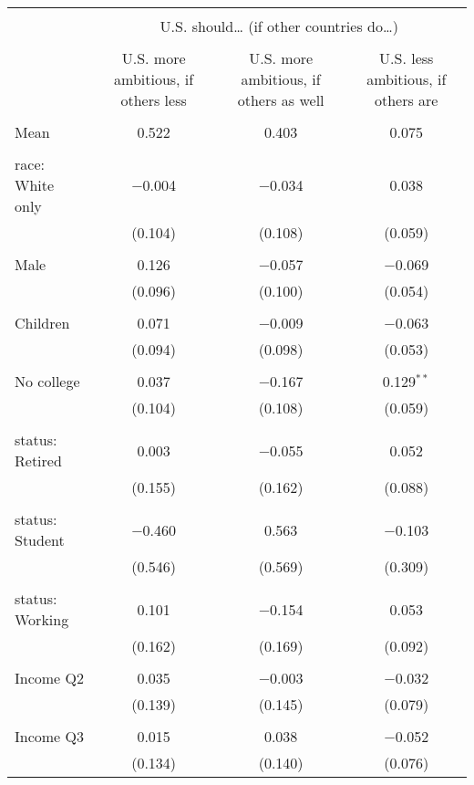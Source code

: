 
\begin{tabular}{@{\extracolsep{5pt}}lccc} 
\\[-1.8ex]\hline 
\hline \\[-1.8ex] 
 & \multicolumn{3}{c}{U.S. should… (if other countries do…)} \\ 
\cline{2-4} 
\\[-1.8ex] & U.S. more ambitious, if others less & U.S. more ambitious, if others as well & U.S. less ambitious, if others are \\ 
\hline \\[-1.8ex] 
 Mean & 0.522 & 0.403 & 0.075  \\ \hline \\[-1.8ex] race: White only & $-$0.004 & $-$0.034 & 0.038 \\ 
  & (0.104) & (0.108) & (0.059) \\ 
  & & & \\ 
 Male & 0.126 & $-$0.057 & $-$0.069 \\ 
  & (0.096) & (0.100) & (0.054) \\ 
  & & & \\ 
 Children & 0.071 & $-$0.009 & $-$0.063 \\ 
  & (0.094) & (0.098) & (0.053) \\ 
  & & & \\ 
 No college & 0.037 & $-$0.167 & 0.129$^{**}$ \\ 
  & (0.104) & (0.108) & (0.059) \\ 
  & & & \\ 
 status: Retired & 0.003 & $-$0.055 & 0.052 \\ 
  & (0.155) & (0.162) & (0.088) \\ 
  & & & \\ 
 status: Student & $-$0.460 & 0.563 & $-$0.103 \\ 
  & (0.546) & (0.569) & (0.309) \\ 
  & & & \\ 
 status: Working & 0.101 & $-$0.154 & 0.053 \\ 
  & (0.162) & (0.169) & (0.092) \\ 
  & & & \\ 
 Income Q2 & 0.035 & $-$0.003 & $-$0.032 \\ 
  & (0.139) & (0.145) & (0.079) \\ 
  & & & \\ 
 Income Q3 & 0.015 & 0.038 & $-$0.052 \\ 
  & (0.134) & (0.140) & (0.076) \\ 

\end{tabular}
